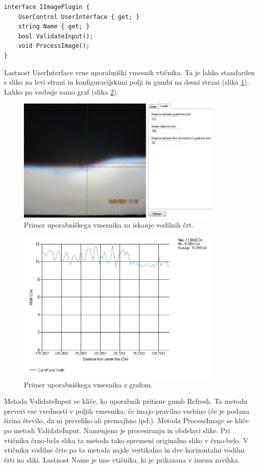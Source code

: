\documentclass[oneside, a4paper, 12pt]{book}
\begin{document}
\begin{samepage}
\begin{verbatim}
interface IImagePlugin {
    UserControl UserInterface { get; }
    string Name { get; }
    bool ValidateInput();
    void ProcessImage();
}
\end{verbatim}
\end{samepage}
Lastnost UserInterface vrne uporabniški vmesnik vtičnika. Ta je lahko standarden s sliko na levi strani in konfiguracijskimi polji in gumbi na desni strani (slika \ref{pic:vmesnik2}). Lahko pa vsebuje samo graf (slika \ref{pic:vmesnik3}).
\begin{figure}
\begin{center}
\includegraphics[width=10cm]{slike/vmesnik-slika-konfiguracija.jpg}
\end{center}
\caption{Primer uporabniškega vmesnika za iskanje vodilnih črt.}
\label{pic:vmesnik2}
\end{figure}
\begin{figure}
\begin{center}
\includegraphics[width=10cm]{slike/vmesnik-samo-graf.jpg}
\end{center}
\caption{Primer uporabniškega vmesnika z grafom.}
\label{pic:vmesnik3}
\end{figure}
Metoda ValidateInput se kliče, ko uporabnik pritisne gumb Refresh. Ta metoda preveri vse vrednosti v poljih vmesnika, če imajo pravilno vsebino (če je podana širina število, da ni preveliko ali premajhno ipd.). Metoda ProcessImage se kliče po metodi ValidateInput. Namenjena je procesiranju in obdelavi slike. Pri vtičniku črno-bela slika ta metoda tako spremeni originalno sliko v črno-belo. V vtičniku vodilne črte pa ta metoda najde vertikalno in dve horizontalni vodilni črti na sliki. Lastnost Name je ime vtičnika, ki je prikazana v imenu zavihka.
\end{document}
